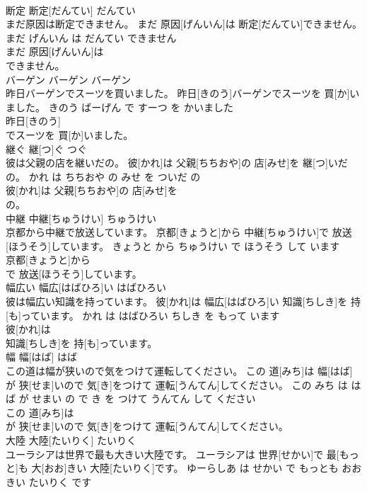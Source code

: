 \documentclass[8pt]{extreport}
\begin{document}
\begin{CJK}{UTF8}{min}
\\	断定	断定[だんてい]	だんてい	
\\	まだ原因は断定できません。	まだ 原因[げんいん]は 断定[だんてい]できません。	まだ げんいん は だんてい できません	
\\	まだ 原因[げんいん]は
\\	できません。			
\\	バーゲン	バーゲン	バーゲン	
\\	昨日バーゲンでスーツを買いました。	昨日[きのう]バーゲンでスーツを 買[か]いました。	きのう ばーげん で すーつ を かいました	
\\	昨日[きのう]
\\	でスーツを 買[か]いました。			
\\	継ぐ	継[つ]ぐ	つぐ	
\\	彼は父親の店を継いだの。	彼[かれ]は 父親[ちちおや]の 店[みせ]を 継[つ]いだの。	かれ は ちちおや の みせ を ついだ の	
\\	彼[かれ]は 父親[ちちおや]の 店[みせ]を
\\	の。			
\\	中継	中継[ちゅうけい]	ちゅうけい	
\\	京都から中継で放送しています。	京都[きょうと]から 中継[ちゅうけい]で 放送[ほうそう]しています。	きょうと から ちゅうけい で ほうそう して います	
\\	京都[きょうと]から
\\	で 放送[ほうそう]しています。			
\\	幅広い	幅広[はばひろ]い	はばひろい	
\\	彼は幅広い知識を持っています。	彼[かれ]は 幅広[はばひろ]い 知識[ちしき]を 持[も]っています。	かれ は はばひろい ちしき を もって います	
\\	彼[かれ]は
\\	知識[ちしき]を 持[も]っています。			
\\	幅	幅[はば]	はば	
\\	この道は幅が狭いので気をつけて運転してください。	この 道[みち]は 幅[はば]が 狭[せま]いので 気[き]をつけて 運転[うんてん]してください。	この みち は はば が せまい の で き を つけて うんてん して ください	
\\	この 道[みち]は
\\	が 狭[せま]いので 気[き]をつけて 運転[うんてん]してください。			
\\	大陸	大陸[たいりく]	たいりく	
\\	ユーラシアは世界で最も大きい大陸です。	ユーラシアは 世界[せかい]で 最[もっと]も 大[おお]きい 大陸[たいりく]です。	ゆーらしあ は せかい で もっとも おおきい たいりく です	

\end{CJK}
\end{document}
